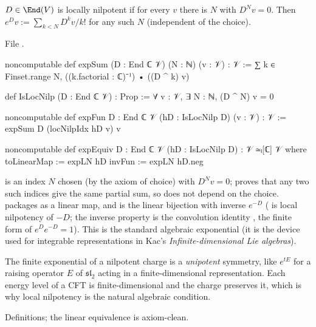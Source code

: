\begin{definition}\label{l04:def:exp}
$D\in\End(\lfourV)$ is locally nilpotent if for every $v$ there is $N$ with $D^Nv = 0$. Then
$e^Dv := \sum_{k<N}D^kv/k!$ for any such $N$ (independent of the choice).
\end{definition}
\noindent File .
\begin{leancode}
noncomputable def expSum (D : End ℂ 𝒱) (N : ℕ) (v : 𝒱) : 𝒱 :=
  ∑ k ∈ Finset.range N, ((k.factorial : ℂ)⁻¹) • ((D ^ k) v)

def IsLocNilp (D : End ℂ 𝒱) : Prop := ∀ v : 𝒱, ∃ N : ℕ, (D ^ N) v = 0

noncomputable def expFun {D : End ℂ 𝒱} (hD : IsLocNilp D) (v : 𝒱) : 𝒱 :=
  expSum D (locNilpIdx hD v) v

noncomputable def expEquiv {D : End ℂ 𝒱} (hD : IsLocNilp D) : 𝒱 ≃ₗ[ℂ] 𝒱 where
  toLinearMap := expLN hD
  invFun := expLN hD.neg
\end{leancode}
\begin{dictionary}
 is an index $N$ chosen (by the axiom of choice) with $D^Nv = 0$;
 proves that any two such indices give the same partial sum, so  does
not depend on the choice.  packages  as a linear map, and 
is the linear bijection with inverse $e^{-D}$ ( is local nilpotency of $-D$; the
inverse property is the convolution identity , the finite form of
$e^De^{-D} = 1$). This is the standard algebraic exponential (it is the device used for integrable representations in Kac's \emph{Infinite-dimensional
Lie algebras}).
\end{dictionary}
\begin{physics}
The finite exponential of a nilpotent charge is a \emph{unipotent} symmetry, like $e^{tE}$ for a
raising operator $E$ of $\mathfrak{sl}_2$ acting in a finite-dimensional representation. Each energy
level of a CFT is finite-dimensional and the charge preserves it, which is why local nilpotency is the
natural algebraic condition.
\end{physics}
\begin{status}
Definitions; the linear equivalence is axiom-clean.
\end{status}

